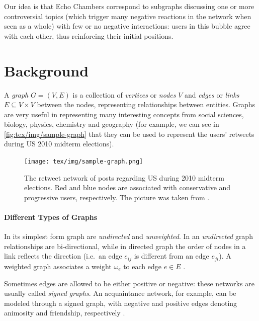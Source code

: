 Our idea is that Echo Chambers correspond to subgraphs discussing one or more
controversial topics (which trigger many negative reactions in the network when
seen as a whole) with few or no negative interactions: users in this bubble
agree with each other, thus reinforcing their initial positions.

\section{Background}
\label{sec:background}

A \emph{graph} $G = (V, E)$ is a collection of \emph{vertices} or \emph{nodes} $V$ and
\emph{edges} or \emph{links} $E \subseteq V \times V$ between the nodes, representing relationships
between entities. Graphs are very useful in
representing many interesting concepts from social sciences, biology, physics,
chemistry and geography (for example, we can see in
\autoref{fig:tex/img/sample-graph} that they
can be used to represent the users' retweets during US 2010 midterm
elections)\cite{Newman2018,Menczer2020}.

\begin{figure}
	\centering
	\texttt{[image: tex/img/sample-graph.png]}
	\caption[Retweet network during 2010 midterm elections]{The retweet network of posts regarding US during 2010 midterm
		elections. Red and blue nodes are associated with conservative and
		progressive users, respectively. The picture was taken from
		\cite{Menczer2020}.}
	\label{fig:tex/img/sample-graph}
\end{figure}

\paragraph{Different Types of Graphs}%
\label{par:different_types_of_graphs}

In its simplest form graph are \emph{undirected} and \emph{unweighted}. In an
\emph{undirected} graph relationships are bi-directional, while in directed graph
the order of nodes in a link reflects the
direction (i.e.\ an edge $e_{ij} $ is different from an edge $e_{ji} $). A weighted
graph associates a weight $\omega _e$ to each edge $e \in E$
\cite{Menczer2020,AlbertLaszloNortheasternUniversity2016}.

Sometimes edges are allowed to be either positive or negative: these networks
are usually called \emph{signed graphs}. An acquaintance
network, for example, can be modeled through a signed graph, with negative and
positive edges denoting animosity and friendship, respectively \cite{Newman2018}.

